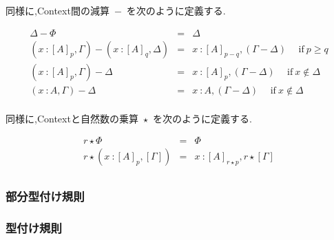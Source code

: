\documentclass{jsarticle}
\begin{document}
同様に,Context間の減算\ $-$\ を次のように定義する.

\begin{eqnarray*}
  \Delta - \Phi &=& \Delta \\
  (x\ \colon [A]_p,\Gamma) - (x\ \colon [A]_q,\Delta) &=& x\ \colon [A]_{p-q},(\Gamma - \Delta) \hspace{15pt} \mbox{if}\ p \geq q \\
  (x\ \colon [A]_p,\Gamma) - \Delta &=& x\ \colon [A]_p,(\Gamma - \Delta) \hspace{15pt} \mbox{if}\ x \notin \Delta \\
  (x\ \colon A,\Gamma) - \Delta &=& x\ \colon A,(\Gamma - \Delta) \hspace{15pt} \mbox{if}\ x \notin \Delta \\
\end{eqnarray*}

同様に,Contextと自然数の乗算\ $\star$\ を次のように定義する.

\begin{eqnarray*}
  r \star \Phi &=& \Phi \\
  r \star (x\ \colon [A]_p,[\Gamma]) &=& x\ \colon [A]_{r \star p},r \star [\Gamma] \\
\end{eqnarray*}

\subsubsection{部分型付け規則}

\begin{multicols}{2}




  \infrule[o-ic]{}{
    \Gamma <: \Gamma
  }

\end{multicols}

\subsubsection{型付け規則}
\end{document}

